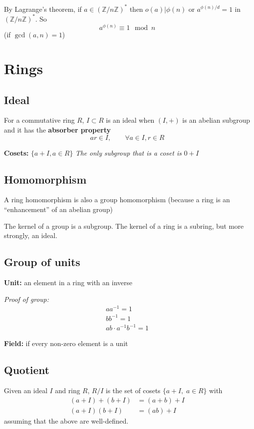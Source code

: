 \documentclass[12pt]{article}
\newcommand{\Z}{\mathbb{Z}}
\begin{document}
By Lagrange's theorem, if $a \in (\Z/n\Z)^*$ then $o(a) \bigg\vert \phi(n)$ or $a^{\phi(n)/d} = 1$ in $(\Z/n\Z)^*$. So 
\[a^{\phi(n)} \equiv 1 \mod n \]
(if $\gcd(a, n) = 1$)

\section*{Rings}
\subsection*{Ideal}
For a commutative ring $R$, $I \subset R$ is an ideal when $(I, +)$ is an abelian subgroup and it has the \textbf{absorber property} 
\[ar \in I, \qquad \forall a \in I, r\in R\]

\textbf{Cosets:} $\{a + I, a\in R\}$ 
\emph{The only subgroup that is a coset is $0 + I$}

\subsection*{Homomorphism}
A ring homomorphism is also a group homomorphism (because a ring is an ``enhancement'' of an abelian group)

The kernel of a group is a subgroup. The kernel of a ring is a subring, but more strongly, an ideal. 

\subsection*{Group of units}
\textbf{Unit:} an element in a ring with an inverse 

\emph{Proof of group:}
\begin{gather}
    aa^{-1} = 1\\ 
    bb^{-1} = 1\\ 
    ab \cdot a^{-1}b^{-1} = 1
\end{gather}

\textbf{Field:} if every non-zero element is a unit 

\subsection*{Quotient}
Given an ideal $I$ and ring $R$, $R/I$ is the set of cosets $\{a + I, \; a\in R\}$ with
\begin{align*}
    (a + I) + (b + I) &= (a + b) + I\\ 
    (a + I)(b + I) &= (ab) + I
\end{align*}
assuming that the above are well-defined.
\end{document}
